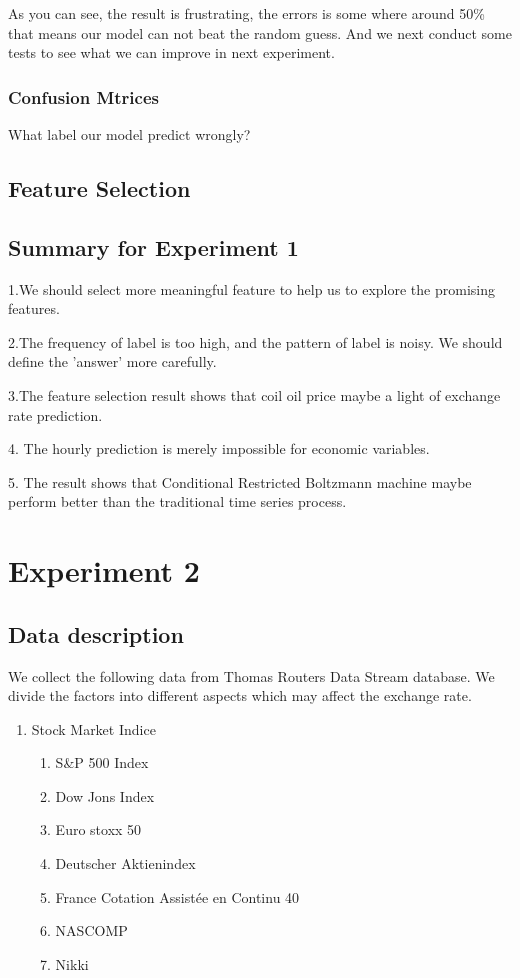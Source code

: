 {\begin{table}[h]
\end{table}

    As you can see, the result is frustrating, the errors is some where around 50\% that means our model can not beat the random guess.
    And we next conduct some tests to see what we can improve in next experiment.


\subsubsection{Confusion Mtrices}
What label our model predict wrongly?
\subsection{Feature Selection}
\subsection{Summary for Experiment 1}
1.We should select more meaningful feature to help us to explore the promising features.

2.The frequency of label is too high, and the pattern of label is noisy. We should define the 'answer' more carefully.

3.The feature selection result shows that coil oil price maybe a light of exchange rate prediction.

4. The hourly prediction is merely impossible for economic variables.

5. The result shows that Conditional Restricted Boltzmann machine maybe perform better than the traditional time series process.

\section{Experiment 2}

\subsection{Data description}
We collect the following data from Thomas Routers Data Stream database.
    We divide the factors into different aspects which may affect the exchange rate.


\begin{enumerate}
\item{Stock Market Indice}

\begin{enumerate}
    \item{S&P 500 Index}
    \item{Dow Jons Index}
    \item{Euro stoxx 50 }
    \item{Deutscher Aktienindex}
    \item{France Cotation Assistée en Continu 40}
    \item{NASCOMP}
    \item{Nikki}
\end{enumerate}


\end{enumerate}}
